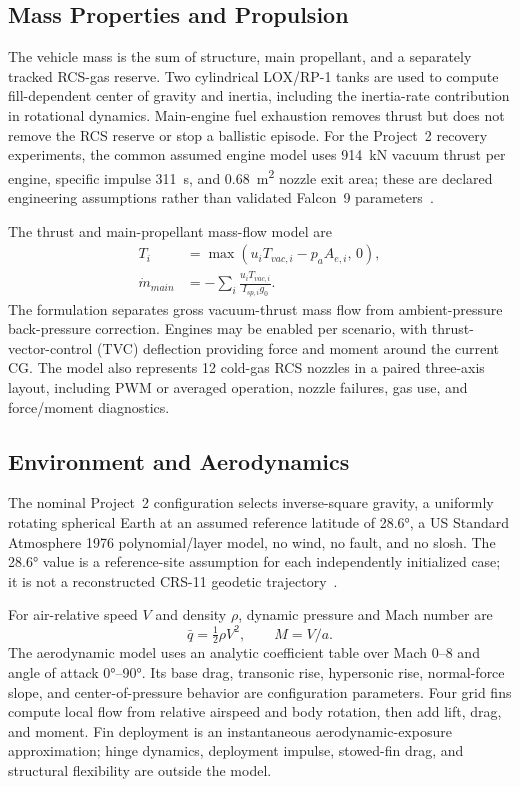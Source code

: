 \documentclass[11pt,letterpaper]{article}
\begin{document}
\subsection{Mass Properties and Propulsion}

The vehicle mass is the sum of structure, main propellant, and a separately tracked RCS-gas reserve. Two cylindrical LOX/RP-1 tanks are used to compute fill-dependent center of gravity and inertia, including the inertia-rate contribution in rotational dynamics. Main-engine fuel exhaustion removes thrust but does not remove the RCS reserve or stop a ballistic episode. For the Project~2 recovery experiments, the common assumed engine model uses \SI{914}{\kilo\newton} vacuum thrust per engine, specific impulse \SI{311}{\second}, and \SI{0.68}{\square\metre} nozzle exit area; these are declared engineering assumptions rather than validated Falcon~9 parameters~\cite{scenario_spec}.

The thrust and main-propellant mass-flow model are
\begin{align}
 T_i &= \max\left(u_iT_{vac,i} - p_aA_{e,i},\,0\right),\\
 \dot{m}_{main} &= -\sum_i\frac{u_iT_{vac,i}}{I_{sp,i}g_0}.
\end{align}
The formulation separates gross vacuum-thrust mass flow from ambient-pressure back-pressure correction. Engines may be enabled per scenario, with thrust-vector-control (TVC) deflection providing force and moment around the current CG. The model also represents 12 cold-gas RCS nozzles in a paired three-axis layout, including PWM or averaged operation, nozzle failures, gas use, and force/moment diagnostics.

\subsection{Environment and Aerodynamics}

The nominal Project~2 configuration selects inverse-square gravity, a uniformly rotating spherical Earth at an assumed reference latitude of \ang{28.6}, a US Standard Atmosphere 1976 polynomial/layer model, no wind, no fault, and no slosh. The \ang{28.6} value is a reference-site assumption for each independently initialized case; it is not a reconstructed CRS-11 geodetic trajectory~\cite{scenario_spec,physics_report}.

For air-relative speed $V$ and density $\rho$, dynamic pressure and Mach number are
\begin{equation}
 \bar{q}=\tfrac{1}{2}\rho V^2, \qquad M=V/a.
\end{equation}
The aerodynamic model uses an analytic coefficient table over Mach 0--8 and angle of attack \ang{0}--\ang{90}. Its base drag, transonic rise, hypersonic rise, normal-force slope, and center-of-pressure behavior are configuration parameters. Four grid fins compute local flow from relative airspeed and body rotation, then add lift, drag, and moment. Fin deployment is an instantaneous aerodynamic-exposure approximation; hinge dynamics, deployment impulse, stowed-fin drag, and structural flexibility are outside the model.
\end{document}
